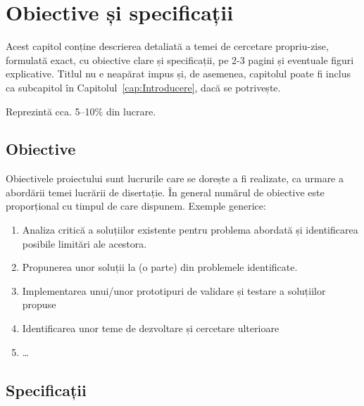 \chapter{Obiective și specificații}
\label{cap:obiective-specificatii}

Acest capitol conține descrierea detaliată a temei de cercetare propriu-zise, formulată exact, cu obiective clare și specificații, pe 2-3 pagini și eventuale figuri explicative. Titlul nu e neapărat impus și, de asemenea, capitolul poate fi inclus ca subcapitol în Capitolul~\ref{cap:Introducere}, dacă se potrivește.

Reprezintă cca. 5--10\% din lucrare.

\section{Obiective}

Obiectivele proiectului sunt lucrurile care se dorește a fi realizate, ca urmare a abordării temei lucrării de disertație. În general numărul de obiective este proporțional cu timpul de care dispunem. Exemple generice:
\begin{enumerate}
  \item Analiza critică a soluțiilor existente pentru problema abordată și identificarea posibile limitări ale acestora.
  \item Propunerea unor soluții la (o parte) din problemele identificate. 
  \item Implementarea unui/unor prototipuri de validare și testare a soluțiilor propuse 
  \item Identificarea unor teme de dezvoltare și cercetare ulterioare
  \item \dots
\end{enumerate}


\section{Specificații}

